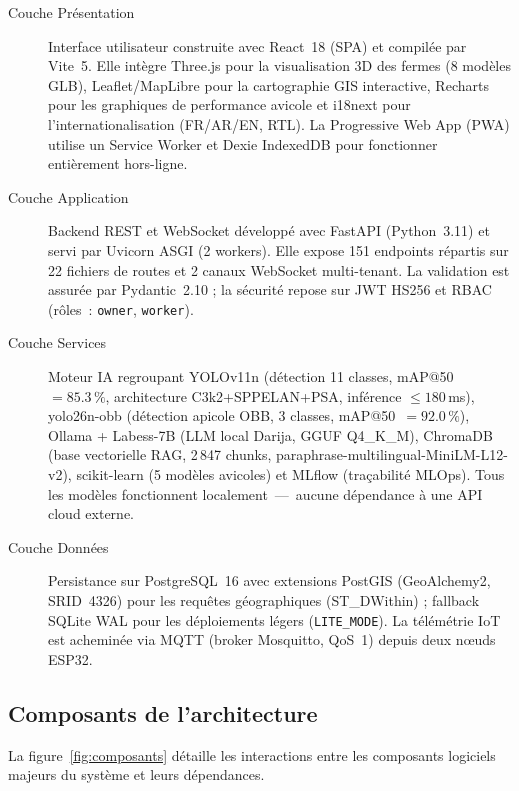 \medskip

\begin{description}
  \item[Couche Présentation] Interface utilisateur construite avec React~18 (SPA)
        et compilée par Vite~5. Elle intègre Three.js pour la visualisation 3D
        des fermes (8 modèles GLB), Leaflet/MapLibre pour la cartographie GIS
        interactive, Recharts pour les graphiques de performance avicole et
        i18next pour l'internationalisation (FR/AR/EN, RTL). La Progressive Web App
        (PWA) utilise un Service Worker et Dexie IndexedDB pour fonctionner
        entièrement hors-ligne.
  \item[Couche Application] Backend REST et WebSocket développé avec FastAPI
        (Python~3.11) et servi par Uvicorn ASGI (2 workers). Elle expose
        151 endpoints répartis sur 22 fichiers de routes et 2 canaux WebSocket
        multi-tenant. La validation est assurée par Pydantic~2.10 ; la sécurité
        repose sur JWT HS256 et RBAC (rôles~: \texttt{owner}, \texttt{worker}).
  \item[Couche Services] Moteur IA regroupant YOLOv11n (détection 11 classes,
        mAP@50~$= 85.3\,\%$, architecture C3k2+SPPELAN+PSA, inférence $\leq 180$\,ms),
        yolo26n-obb (détection apicole OBB, 3 classes, mAP@50~$= 92.0\,\%$),
        Ollama + Labess-7B (LLM local Darija, GGUF Q4\_K\_M),
        ChromaDB (base vectorielle RAG, 2\,847 chunks, paraphrase-multilingual-MiniLM-L12-v2),
        scikit-learn (5 modèles avicoles) et MLflow (traçabilité MLOps).
        Tous les modèles fonctionnent localement~---~aucune dépendance à une API cloud externe.
  \item[Couche Données] Persistance sur PostgreSQL~16 avec extensions PostGIS
        (GeoAlchemy2, SRID~4326) pour les requêtes géographiques (ST\_DWithin) ;
        fallback SQLite WAL pour les déploiements légers (\texttt{LITE\_MODE}).
        La télémétrie IoT est acheminée via MQTT (broker Mosquitto, QoS~1)
        depuis deux nœuds ESP32.
\end{description}

\subsection{Composants de l'architecture}

La figure~\ref{fig:composants} détaille les interactions entre les composants
logiciels majeurs du système et leurs dépendances.

